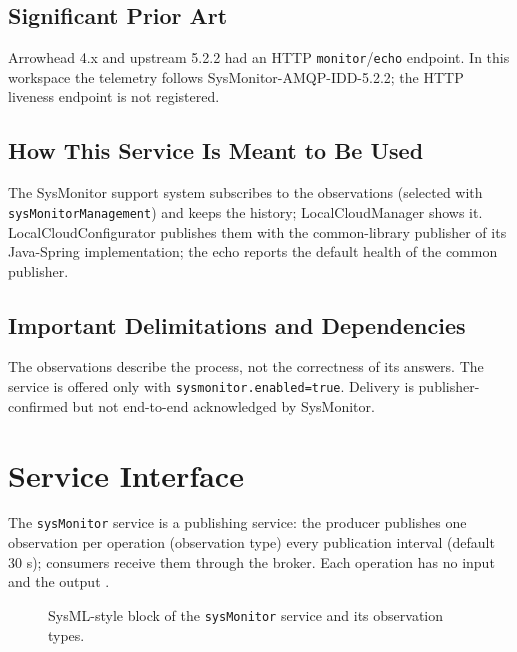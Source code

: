\documentclass[a4paper]{arrowhead}
\newcommand{\mref}[2][]{{\textcolor{ArrowheadPurple}{\hyperref[sec:model:#2]{\ifstrempty{#1}{#2}{#1}}}}}
\begin{document}
\subsection{Significant Prior Art}

Arrowhead 4.x and upstream 5.2.2 had an HTTP \texttt{monitor}/\texttt{echo} endpoint. In this workspace the telemetry follows SysMonitor-AMQP-IDD-5.2.2; the HTTP liveness endpoint is not registered.

\subsection{How This Service Is Meant to Be Used}

The SysMonitor support system subscribes to the observations (selected with \texttt{sys\allowbreak{}Monitor\allowbreak{}Management}) and keeps the history; LocalCloudManager shows it. LocalCloudConfigurator publishes them with the common-library publisher of its Java-Spring implementation; the echo reports the default health of the common publisher.

\subsection{Important Delimitations and Dependencies}
\label{sec:delimitations}

The observations describe the process, not the correctness of its answers. The service is offered only with \texttt{sysmonitor.\allowbreak{}enabled=\allowbreak{}true}. Delivery is publisher-confirmed but not end-to-end acknowledged by SysMonitor.

\newpage

\section{Service Interface}
\label{sec:operations}

The \texttt{sysMonitor} service is a publishing service: the producer publishes one observation per operation (observation type) every publication interval (default 30 s); consumers receive them through the broker. Each operation has no input and the output \mref{Observation}.

\begin{figure}[ht!]
  \centering
  \caption{SysML-style block of the \texttt{sysMonitor} service and its observation types.}
  \label{fig:SD}
\end{figure}
\end{document}
